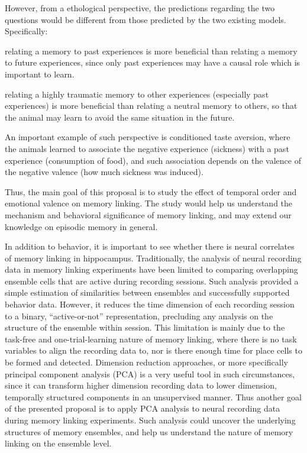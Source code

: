 \documentclass[master.tex]{subfiles}
\begin{document}
However, from a ethological perspective, the predictions regarding the two
questions would be different from those predicted by the two existing models.
Specifically:
\begin{inparaenum}[a)]
\item relating a memory to past experiences is more beneficial than relating a
  memory to future experiences, since only past experiences may have a causal
  role which is important to learn.
\item relating a highly traumatic memory to other experiences (especially past
  experiences) is more beneficial than relating a neutral memory to others, so
  that the animal may learn to avoid the same situation in the future.
\end{inparaenum}
An important example of such perspective is conditioned taste aversion, where
the animals learned to associate the negative experience (sickness) with a past
experience (consumption of food), and such association depends on the valence of
the negative valence (how much sickness was induced).

Thus, the main goal of this proposal is to study the effect of temporal order
and emotional valence on memory linking. The study would help us understand the
mechanism and behavioral significance of memory linking, and may extend our
knowledge on episodic memory in general.

In addition to behavior, it is important to see whether there is neural
correlates of memory linking in hippocampus. Traditionally, the analysis of
neural recording data in memory linking experiments have been limited to
comparing overlapping ensemble cells that are active during recording sessions.
Such analysis provided a simple estimation of similarities between ensembles and
successfully supported behavior data. However, it reduces the time dimension of
each recording session to a binary, ``active-or-not'' representation, precluding
any analysis on the structure of the ensemble within session. This limitation is
mainly due to the task-free and one-trial-learning nature of memory linking,
where there is no task variables to align the recording data to, nor is there
enough time for place cells to be formed and detected. Dimension reduction
approaches, or more specifically principal component analysis (PCA) is a very
useful tool in such circumstances, since it can transform higher dimension
recording data to lower dimension, temporally structured components in an
unsupervised manner. Thus another goal of the presented proposal is to apply PCA
analysis to neural recording data during memory linking experiments. Such
analysis could uncover the underlying structures of memory ensembles, and help
us understand the nature of memory linking on the ensemble level.
\end{document}
